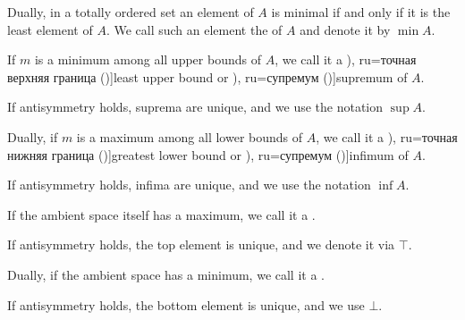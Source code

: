 \begin{definition}
\begin{thmenum}
\begin{paracol}{2}
      \begin{rightcolumn}
        Dually, in a totally ordered set an element of \( A \) is minimal if and only if it is the least element of \( A \). We call such an element the  of \( A \) and denote it by \( \min A \).
      \end{rightcolumn}
    \end{paracol}

    \begin{paracol}{2}
      \begin{leftcolumn}
        If \( m \) is a minimum among all upper bounds of \( A \), we call it a \term[bg=точна горна граница (\cite[19]{Тагамлицки1971ДиференциалноСмятане}), ru=точная верхняя граница (\cite[\S 5.12]{Ляпин1960Полугруппы})]{least upper bound} or \term[bg=супремум (\cite[10]{Проданов1982ФункционаленАнализЧаст1}), ru=супремум (\cite[\S 5.12]{Ляпин1960Полугруппы})]{supremum} of \( A \).

        If antisymmetry holds, suprema are unique, and we use the notation \( \sup A \).
      \end{leftcolumn}

      \begin{rightcolumn}
        Dually, if \( m \) is a maximum among all lower bounds of \( A \), we call it a \term[bg=точна долна граница (\cite[19]{Тагамлицки1971ДиференциалноСмятане}), ru=точная нижняя граница (\cite[\S 5.12]{Ляпин1960Полугруппы})]{greatest lower bound} or \term[bg=инфимум (\cite[10]{Проданов1982ФункционаленАнализЧаст1}), ru=супремум (\cite[\S 5.12]{Ляпин1960Полугруппы})]{infimum} of \( A \).

        If antisymmetry holds, infima are unique, and we use the notation \( \inf A \).
      \end{rightcolumn}
    \end{paracol}

    \begin{paracol}{2}
      \begin{leftcolumn}
        If the ambient space itself has a maximum, we call it a .

        If antisymmetry holds, the top element is unique, and we denote it via \( \top \).
      \end{leftcolumn}

      \begin{rightcolumn}
        Dually, if the ambient space has a minimum, we call it a .

        If antisymmetry holds, the bottom element is unique, and we use \( \bot \).
      \end{rightcolumn}
    \end{paracol}
  \end{thmenum}
\end{definition}

